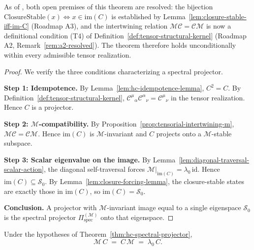 \begin{remark}
\label{rem:hc-spectral-projector-conditional}
As of , both open premises of this theorem are resolved:
the bijection $\mathrm{ClosureStable}(x)\Leftrightarrow x\in\mathrm{im}(C)$
is established by Lemma~\ref{lem:closure-stable-iff-im-C} (Roadmap A3),
and the intertwining relation $\mathcal{M}\mathcal{C}=\mathcal{C}\mathcal{M}$
is now a definitional condition (T4) of
Definition~\ref{def:tensor-structural-kernel} (Roadmap A2,
Remark~\ref{rem:a2-resolved}).
The theorem therefore holds unconditionally within every admissible
tensor realization.
\end{remark}

\begin{proof}
We verify the three conditions characterizing a spectral projector.

\smallskip
\noindent\textbf{Step 1: Idempotence.}
By Lemma~\ref{lem:hc-idempotence-lemma}, $C^2=C$. By
Definition~\ref{def:tensor-structural-kernel},
$\mathcal{C}^\mu{}_\alpha\mathcal{C}^\alpha{}_\nu = \mathcal{C}^\mu{}_\nu$
in the tensor realization. Hence $C$ is a projector.

\smallskip
\noindent\textbf{Step 2: $\mathcal{M}$-compatibility.}
By Proposition~\ref{prop:tensorial-intertwining-m},
$\mathcal{M}\mathcal{C} = \mathcal{C}\mathcal{M}$. Hence $\mathrm{im}(C)$
is $\mathcal{M}$-invariant and $C$ projects onto a $\mathcal{M}$-stable
subspace.

\smallskip
\noindent\textbf{Step 3: Scalar eigenvalue on the image.}
By Lemma~\ref{lem:diagonal-traversal-scalar-action}, the diagonal
self-traversal forces $\mathcal{M}|_{\mathrm{im}(C)} = \lambda_0\,\mathrm{id}$.
Hence $\mathrm{im}(C) \subseteq \mathcal{S}_0$.
By Lemma~\ref{lem:closure-forcing-lemma}, the closure-stable states are
exactly those in $\mathrm{im}(C)$, so $\mathrm{im}(C) = \mathcal{S}_0$.

\smallskip
\noindent\textbf{Conclusion.}
A projector with $\mathcal{M}$-invariant image equal to a single eigenspace
$\mathcal{S}_0$ is the spectral projector $\Pi^{(\mathcal{M})}_{\mathrm{spec}}$
onto that eigenspace.
\end{proof}

\begin{corollary}
\label{cor:M-HC-fixpoint}
Under the hypotheses of Theorem~\ref{thm:hc-spectral-projector},
\[
 \mathcal{M}\,C \;=\; C\,\mathcal{M} \;=\; \lambda_0\,C.
\]
\end{corollary}

